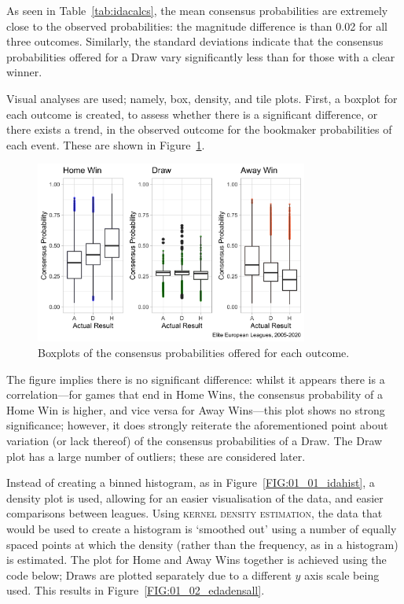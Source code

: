 \documentclass[a4paper,10pt]{report}
\begin{document}
As seen in Table~\ref{tab:idacalcs}, the mean consensus probabilities are extremely close to the observed probabilities: the magnitude difference is than 0.02 for all three outcomes. Similarly, the standard deviations indicate that the consensus probabilities offered for a Draw vary significantly less than for those with a clear winner. \vspace{3mm}

Visual analyses are used; namely, box, density, and tile plots. First, a boxplot for each outcome is created, to assess whether there is a significant difference, or there exists a trend, in the observed outcome for the bookmaker probabilities of each event. These are shown in Figure~\ref{FIG:01_02_bp}.

\begin{figure}[h!]\begin{center}
	\includegraphics[width=0.8\textwidth]{elite_02_boxplot.png}
	\caption{Boxplots of the consensus probabilities offered for each outcome.}\label{FIG:01_02_bp}
\end{center}\end{figure}

The figure implies there is no significant difference: whilst it appears there is a correlation---for games that end in Home Wins, the consensus probability of a Home Win is higher, and vice versa for Away Wins---this plot shows no strong significance; however, it does strongly reiterate the aforementioned point about variation (or lack thereof) of the consensus probabilities of a Draw. The Draw plot has a large number of outliers; these are considered later.\vspace{3mm}

Instead of creating a binned histogram, as in Figure~\ref{FIG:01_01_idahist}, a density plot is used, allowing for an easier visualisation of the data, and easier comparisons between leagues. Using \textsc{kernel density estimation}, the data that would be used to create a histogram is `smoothed out' using a number of equally spaced points at which the density (rather than the frequency, as in a histogram) is estimated. The plot for Home and Away Wins together is achieved using the code below; Draws are plotted separately due to a different $y$ axis scale being used. This results in Figure~\ref{FIG:01_02_edadensall}.
\end{document}
